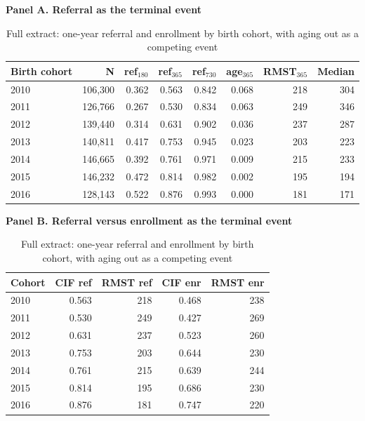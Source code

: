 \begin{table}[htbp]\centering
\caption{Full extract: one-year referral and enrollment by birth cohort, with aging out as a competing event}
\label{tab:E1cohort}
\label{tab:P2end}
\footnotesize
\par\medskip\textbf{Panel A. Referral as the terminal event}\par\smallskip
\begin{tabular}{lrrrrrrr}
\toprule
Birth cohort & N & ref$_{180}$ & ref$_{365}$ & ref$_{730}$ & age$_{365}$ & RMST$_{365}$ & Median \\
\midrule
2010 & 106,300 & 0.362 & 0.563 & 0.842 & 0.068 & 218 & 304 \\
2011 & 126,766 & 0.267 & 0.530 & 0.834 & 0.063 & 249 & 346 \\
2012 & 139,440 & 0.314 & 0.631 & 0.902 & 0.036 & 237 & 287 \\
2013 & 140,811 & 0.417 & 0.753 & 0.945 & 0.023 & 203 & 223 \\
2014 & 146,665 & 0.392 & 0.761 & 0.971 & 0.009 & 215 & 233 \\
2015 & 146,232 & 0.472 & 0.814 & 0.982 & 0.002 & 195 & 194 \\
2016 & 128,143 & 0.522 & 0.876 & 0.993 & 0.000 & 181 & 171 \\
\bottomrule
\end{tabular}
\par\medskip\textbf{Panel B. Referral versus enrollment as the terminal event}\par\smallskip
\begin{tabular}{lrrrr}
\toprule
Cohort & CIF ref & RMST ref & CIF enr & RMST enr \\
\midrule
2010 & 0.563 & 218 & 0.468 & 238 \\
2011 & 0.530 & 249 & 0.427 & 269 \\
2012 & 0.631 & 237 & 0.523 & 260 \\
2013 & 0.753 & 203 & 0.644 & 230 \\
2014 & 0.761 & 215 & 0.639 & 244 \\
2015 & 0.814 & 195 & 0.686 & 230 \\
2016 & 0.876 & 181 & 0.747 & 220 \\
\bottomrule
\end{tabular}

\end{table}

